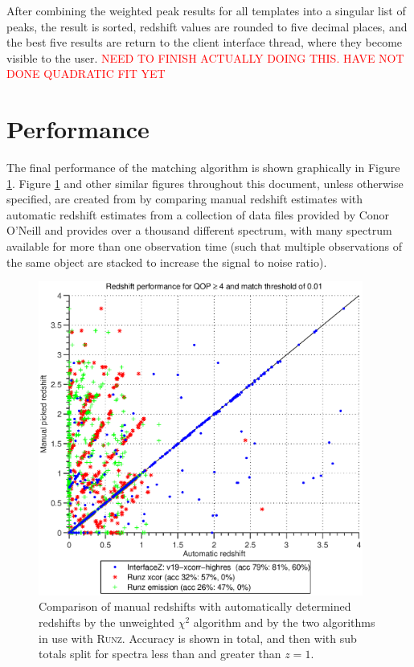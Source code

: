 \documentclass[titlesmallcaps, examinerscopy, copyrightpage]{uqthesis}
\newcommand{\runz}{\textsc{Runz}}
\begin{document}
After combining the weighted peak results for all templates into a singular list of peaks, the result is sorted, redshift values are rounded to five decimal places, and the best five results are return to the client interface thread, where they become visible to the user. \textcolor{red}{NEED TO FINISH ACTUALLY DOING THIS. HAVE NOT DONE QUADRATIC FIT YET}

\section{Performance} \label{sec:performance}

The final performance of the matching algorithm is shown graphically in Figure \ref{fig:final}. Figure \ref{fig:final} and other similar figures throughout this document, unless otherwise specified, are created from by comparing manual redshift estimates with automatic redshift estimates from a collection of data files provided by Conor O'Neill and provides over a thousand different spectrum, with many spectrum available for more than one observation time (such that multiple observations of the same object are stacked to increase the signal to noise ratio). 



\begin{figure}[ht!]
\includegraphics[width=0.95\textwidth]{images/final.eps} 
\centering
\caption{Comparison of manual redshifts with automatically determined redshifts by the unweighted $\chi^2$ algorithm and by the two algorithms in use with \runz{}. Accuracy is shown in total, and then with sub totals split for spectra less than and greater than $z=1$.}
\label{fig:final}
\end{figure}
\end{document}
